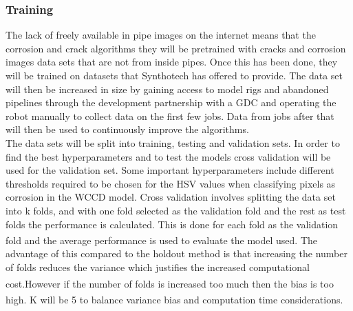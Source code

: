 \documentclass[11pt]{article}		%
\newcommand{\supercite}[1]{\textsuperscript{\cite{#1}}}		%
\begin{document}
			
        \subsubsection{Training}
        The lack of freely available in pipe images on the internet means that %
	       the corrosion and crack algorithms they will be pretrained with cracks and corrosion images data sets that are not from inside pipes. %
	       Once this has been done, they will be trained on datasets that Synthotech has offered to provide. The data set will then be increased in size by gaining access to model rigs and abandoned pipelines through the development partnership with a GDC and operating the robot manually to collect data on the first few jobs. Data from jobs after that will then be used to continuously improve the algorithms. %
	      \\ \hspace*{3ex}
	       The data sets will be split into training, testing and validation sets. In order to find the best hyperparameters and to test the models cross validation will be used for the validation set. Some important hyperparameters include different thresholds required to be chosen for the HSV values when classifying pixels as corrosion in the WCCD model. Cross validation involves splitting the data set into k folds, and with one fold selected as the validation fold and the rest as test folds the performance is calculated. This is done for each fold as the validation fold and the average performance is used to evaluate the model used.\supercite{Cross_Validation}  The advantage of this compared to the holdout method is that increasing the number of folds reduces the variance which justifies the increased computational cost.\supercite{Cross_Validation}\supercite{Cross_Validation2}However if the number of folds is increased too much then the bias is too high. K will be 5 to balance variance bias and computation time considerations.\supercite{Cross_Validation_Tradeoff}
	       
\end{document}
